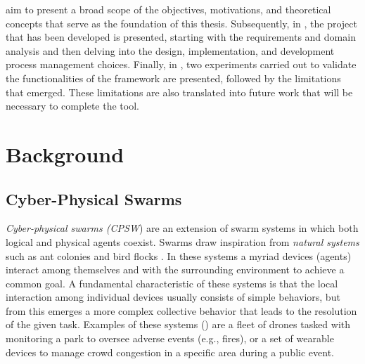 \documentclass[12pt,a4paper,openright,twoside]{book}
\begin{document}
 aim to present a broad scope of the objectives, motivations, and theoretical concepts that serve as the foundation 
    of this thesis. Subsequently, in , the project that has been developed is presented, starting with 
    the requirements and domain analysis and then delving into the design, implementation, and development process management choices. 
    Finally, in , two experiments carried out to validate the functionalities of the framework are presented, followed by the limitations 
    that emerged. These limitations are also translated into future work that will be necessary to complete the tool.

\chapter{Background}
\label{chap:background}

\section{Cyber-Physical Swarms}

\emph{Cyber-physical swarms (CPSW}) are an extension of swarm systems in which both logical and
    physical agents coexist. Swarms draw inspiration from \emph{natural systems} such as ant colonies 
    and bird flocks \cite{tan2013swarm, roy2014nature, bonabeau1999swarm}. In these systems a myriad devices (agents) interact among themselves and with the surrounding 
    environment to achieve a common goal. A fundamental characteristic of these systems is that the local 
    interaction among individual devices usually consists of simple behaviors, but from this emerges a more 
    complex collective behavior that leads to the resolution of the given task. Examples of these systems () are a fleet of drones tasked with monitoring a park to 
    oversee adverse events (e.g., fires), or a set of wearable devices to manage crowd congestion in a specific area during a public event.
\end{document}
